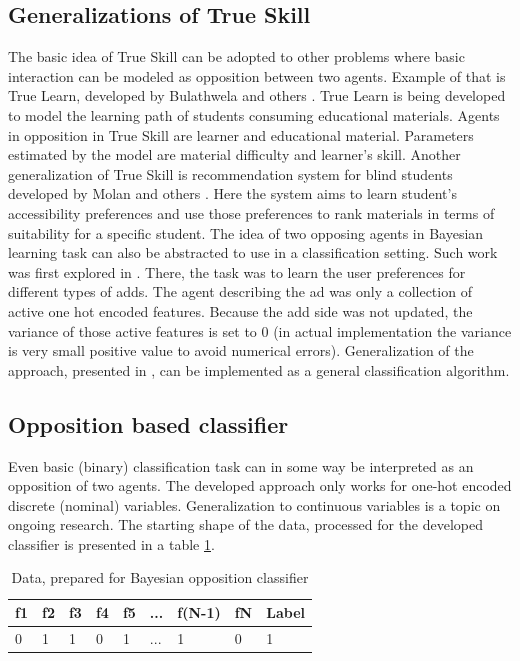 \documentclass{article}
\begin{document}
\subsection{Generalizations of True Skill}
The basic idea of True Skill can be adopted to other problems where basic interaction can be modeled as opposition between two agents. Example of that is True Learn, developed by Bulathwela and others \cite{Sahan}. True Learn is being developed to model the learning path of students consuming educational materials. Agents in opposition in True Skill are learner and educational material. Parameters estimated by the model are material difficulty and learner's skill.
\bigbreak
Another generalization of True Skill is recommendation system for blind students developed by Molan and others \cite{Molan}. Here the system aims to learn student's accessibility preferences and use those preferences to rank materials in terms of suitability for a specific student.
\bigbreak
The idea of two opposing agents in Bayesian learning task can also be abstracted to use in a classification setting. Such work was first explored in \cite{AddPredictor}. There, the task was to learn the user preferences for different types of adds. The agent describing the ad was only a collection of active one hot encoded features. Because the add side was not updated, the variance of those active features is set to 0 (in actual implementation the variance is very small positive value to avoid numerical errors). Generalization of the approach, presented in \cite{AddPredictor}, can be implemented as a general classification algorithm. 

\subsection{Opposition based classifier}
Even basic (binary) classification task can in some way be interpreted as an opposition of two agents. The developed approach only works for one-hot encoded discrete (nominal) variables. Generalization to continuous variables is a topic on ongoing research. The starting shape of the data, processed for the developed classifier is presented in a table \ref{tab:TrueRaw}.
\begin{table}[h!]
\caption{Data, prepared for Bayesian opposition classifier}
\centering
\begin{tabular}{|l|l|l|l|l|l|l|l|l|}
\hline
f1 & f2 & f3 & f4 & f5 & ... & f(N-1) & fN & Label \\ \hline
0  & 1  & 1  & 0  & 1  & ... & 1      & 0  & 1     \\ \hline
\end{tabular}
\label{tab:TrueRaw}
\end{table}
\end{document}
